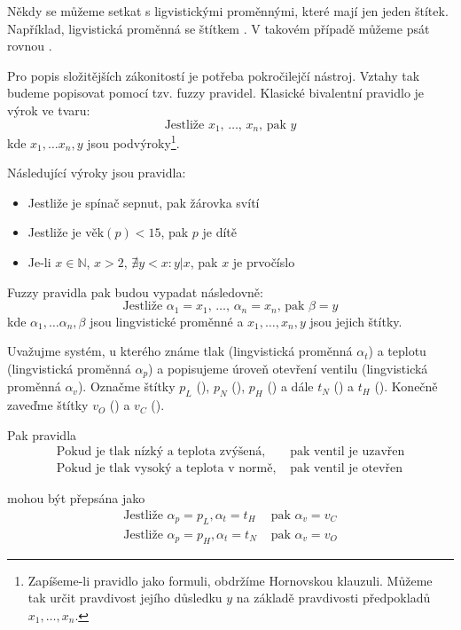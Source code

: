 \documentclass[a4paper,10pt]{article}
\begin{document}
\begin{note}
 Někdy se můžeme setkat s ligvistickými proměnnými, které mají jen jeden štítek. Například, ligvistická proměnná  se štítkem . V takovém případě můžeme psát rovnou .
\end{note}

Pro popis složitějších zákonitostí je potřeba pokročilejčí nástroj. Vztahy tak budeme popisovat pomocí tzv. fuzzy \ifthen pravidel\cite{Jan-FouFuzzContPracAppr}. Klasické bivalentní \ifthen pravidlo je výrok ve tvaru:
$$
 \text{Jestliže $x_1$, $\dots$, $x_n$, pak $y$}
$$
kde $x_1, \dots x_n, y$ jsou podvýroky\footnote{Zapíšeme-li \ifthen pravidlo jako formuli, obdržíme Hornovskou klauzuli. Můžeme tak určit pravdivost jejího důsledku $y$ na základě pravdivosti předpokladů $x_1, \dots, x_n$.}.

\begin{example}
 Následující výroky jsou \ifthen pravidla:
 \begin{itemize}
  \item Jestliže je spínač sepnut, pak žárovka svítí
  \item Jestliže je $\text{věk}(p) < 15$, pak $p$ je dítě
  \item Je-li $x \in \mathbb{N}$, $x > 2$, $\nexists y < x: y|x$, pak $x$ je prvočíslo
 \end{itemize}
\end{example}

Fuzzy \ifthen pravidla pak budou vypadat následovně:
$$
 \text{Jestliže $\alpha_1 = x_1$, $\dots$, $\alpha_n = x_n$, pak $\beta = y$}
$$
kde $\alpha_1, \dots \alpha_n, \beta$ jsou lingvistické proměnné a $x_1, \dots, x_n, y$ jsou jejich štítky.


\begin{example}
 Uvažujme systém, u kterého známe tlak (lingvistická proměnná $\alpha_t$) a teplotu (lingvistická proměnná $\alpha_p$) a popisujeme úroveň otevření ventilu (lingvistická proměnná $\alpha_v$). 
 Označme štítky $p_L$ (), $p_N$ (), $p_H$ () a dále $t_N$ () a $t_H$ (). Konečně zaveďme štítky $v_O$ () a $v_C$ (). 
 
 Pak pravidla
 \begin{align*}
  \text{Pokud je tlak nízký a teplota zvýšená, }&\text{pak ventil je uzavřen} \\
  \text{Pokud je tlak vysoký a teplota v normě, }&\text{pak ventil je otevřen}
 \end{align*}

 mohou být přepsána jako
 \begin{align*}
  \text{Jestliže } \alpha_p = p_L, \alpha_t = t_H &\text{ pak } \alpha_v = v_C \\
  \text{Jestliže } \alpha_p = p_H, \alpha_t = t_N &\text{ pak } \alpha_v = v_O 
 \end{align*}
\end{example}
\end{document}
